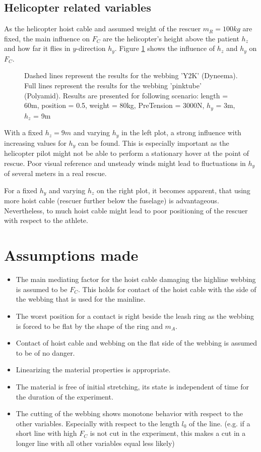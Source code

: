 \documentclass[a4paper,10pt]{scrartcl}
\begin{document}
\subsection{Helicopter related variables}
As the helicopter hoist cable and assumed weight of the rescuer $m_R=100kg$ are fixed, the main influence on $F_C$ are the helicopter's height above the patient $h_z$ and how far it flies in $y$-direction $h_y$. Figure \ref{fig::helicopter::vars} shows the influence of $h_z$ and $h_y$ on $F_C$.

\begin{figure}[ht]
\centering

\caption{Dashed lines represent the results for the webbing 'Y2K' (Dyneema). Full lines represent the results for the webbing 'pinktube' (Polyamid). Results are presented for following scenario: length = 60m, position = 0.5, weight = 80kg, PreTension = 3000N, $h_y$ = 3m, $h_z$ = 9m}
\label{fig::helicopter::vars}
\end{figure}

With a fixed $h_z=9m$ and varying $h_y$ in the left plot, a strong influence with increasing values for $h_y$ can be found. This is especially important as the helicopter pilot might not be able to perform a stationary hover at the point of rescue. Poor visual reference and unsteady winds might lead to fluctuations in $h_y$ of several meters in a real rescue.

For a fixed $h_y$ and varying $h_z$ on the right plot, it becomes apparent, that using more hoist cable (rescuer further below the fuselage) is advantageous. Nevertheless, to much hoist cable might lead to poor positioning of the rescuer with respect to the athlete.

\section{Assumptions made}
\begin{itemize}
\item The main mediating factor for the hoist cable damaging the highline webbing is assumed to be $F_C$. This holds for contact of the hoist cable with the side of the webbing that is used for the mainline.
\item The worst position for a contact is right beside the leash ring as the webbing is forced to be flat by the shape of the ring and $m_A$.
\item Contact of hoist cable and webbing on the flat side of the webbing is assumed to be of no danger.
\item Linearizing the material properties is appropriate.
\item The material is free of initial stretching, its state is independent of time for the duration of the experiment.
\item The cutting of the webbing shows monotone behavior with respect to the other variables. Especially with respect to the length $l_0$ of the line. (e.g. if a short line with high $F_C$ is not cut in the experiment, this makes a cut in a longer line with all other variables equal less likely)
\end{itemize}
\end{document}
